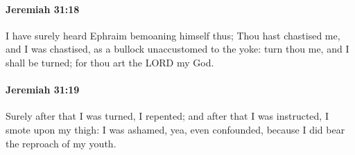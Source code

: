 		\paragraph{Jeremiah 31:18} %
			\label{JEREMIAH-31-18}

			I have surely heard Ephraim bemoaning himself thus; Thou hast chastised me, and I was chastised, as a bullock unaccustomed to the yoke: turn thou me, and I shall be turned; for thou art the LORD my God.


		\paragraph{Jeremiah 31:19} %
			\label{JEREMIAH-31-19}

			Surely after that I was turned, I repented; and after that I was instructed, I smote upon my thigh: I was ashamed, yea, even confounded, because I did bear the reproach of my youth.

